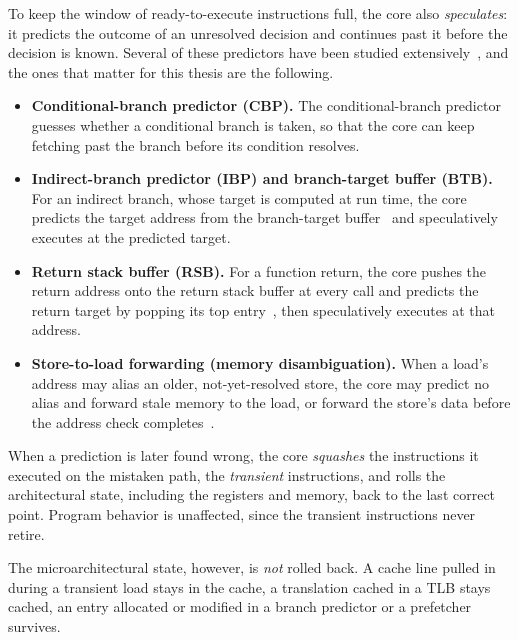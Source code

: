 To keep the window of ready-to-execute instructions full, the core also \emph{speculates}: it predicts the
outcome of an unresolved decision and continues past it before the decision is known. Several of
these predictors have been studied extensively~\cite{hennessy_patterson}, and the ones that matter
for this thesis are the following.
\begin{itemize}
  \item \textbf{Conditional-branch predictor (CBP).} The conditional-branch
    predictor~\cite{smith_bpred,tage} guesses whether a conditional branch is taken, so that the
    core can keep fetching past the branch before its condition resolves.
  \item \textbf{Indirect-branch predictor (IBP) and branch-target buffer (BTB).} For an indirect
    branch, whose target is computed at run time, the core predicts the target address from the
    branch-target buffer~\cite{seznec201164,lee1984branch} and speculatively executes at the
    predicted target.
  \item \textbf{Return stack buffer (RSB).} For a function return, the core pushes the return
    address onto the return stack buffer at every call and predicts the return target by popping
    its top entry~\cite{kaeli1991branch}, then speculatively executes at that address.
  \item \textbf{Store-to-load forwarding (memory disambiguation).} When a load's address may
    alias an older, not-yet-resolved store, the core may predict no alias and forward stale
    memory to the load, or forward the store's data before the address check
    completes~\cite{chrysos1998memory}.
\end{itemize}
When a prediction is later found wrong, the core \emph{squashes} the instructions it executed on
the mistaken path, the \emph{transient} instructions, and rolls the architectural state, including the
registers and memory, back to the last correct point. Program behavior is unaffected, since the
transient instructions never retire.

The microarchitectural state, however, is \emph{not} rolled back. A cache line pulled in during a
transient load stays in the cache, a translation cached in a TLB stays cached, an entry allocated or modified
in a branch predictor or a prefetcher survives.

